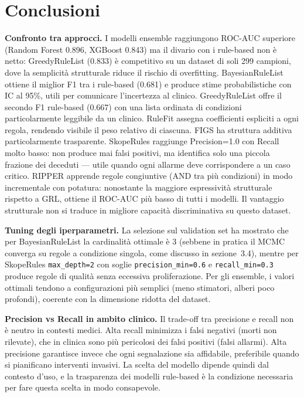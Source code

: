 \documentclass[a4paper,11pt]{article}
\begin{document}
\section{Conclusioni}

\textbf{Confronto tra approcci.}
I modelli ensemble raggiungono ROC-AUC superiore (Random Forest 0.896, XGBoost 0.843)
ma il divario con i rule-based non è netto: GreedyRuleList (0.833) è competitivo su un
dataset di soli 299 campioni, dove la semplicità strutturale riduce il rischio di overfitting.
BayesianRuleList ottiene il miglior F1 tra i rule-based (0.681) e produce stime
probabilistiche con IC al 95\%, utili per comunicare l'incertezza al clinico.
GreedyRuleList offre il secondo F1 rule-based (0.667) con una lista ordinata di condizioni
particolarmente leggibile da un clinico. RuleFit assegna coefficienti espliciti a ogni regola,
rendendo visibile il peso relativo di ciascuna. FIGS ha struttura additiva
particolarmente trasparente. SkopeRules raggiunge Precision=1.0 con Recall molto basso: non
produce mai falsi positivi, ma identifica solo una piccola frazione dei deceduti --- utile quando
ogni allarme deve corrispondere a un caso critico. RIPPER apprende regole congiuntive (AND tra più condizioni) in modo incrementale con potatura:
nonostante la maggiore espressività strutturale rispetto a GRL, ottiene il ROC-AUC più basso
di tutti i modelli. Il vantaggio strutturale non si traduce in migliore capacità discriminativa
su questo dataset.

\textbf{Tuning degli iperparametri.}
La selezione sul validation set ha mostrato che per BayesianRuleList la cardinalità ottimale è
3 (sebbene in pratica il MCMC converga su regole a condizione singola, come discusso
in sezione~3.4), mentre per
SkopeRules \texttt{max\_depth=2} con soglie \texttt{precision\_min=0.6} e
\texttt{recall\_min=0.3} produce regole di qualità senza eccessiva proliferazione. Per gli
ensemble, i valori ottimali tendono a configurazioni più semplici (meno stimatori, alberi poco
profondi), coerente con la dimensione ridotta del dataset.

\textbf{Precision vs Recall in ambito clinico.}
Il trade-off tra precisione e recall non è neutro in contesti medici. Alta recall minimizza i
falsi negativi (morti non rilevate), che in clinica sono più pericolosi dei falsi positivi
(falsi allarmi). Alta precisione garantisce invece che ogni segnalazione sia affidabile,
preferibile quando si pianificano interventi invasivi. La scelta del modello dipende quindi
dal contesto d'uso, e la trasparenza dei modelli rule-based è la condizione necessaria per
fare questa scelta in modo consapevole.
\end{document}

